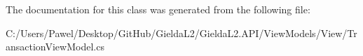 The documentation for this class was generated from the following file\+:\begin{DoxyCompactItemize}
\item 
C\+:/\+Users/\+Pawel/\+Desktop/\+Git\+Hub/\+Gielda\+L2/\+Gielda\+L2.\+A\+P\+I/\+View\+Models/\+View/Transaction\+View\+Model.\+cs\end{DoxyCompactItemize}
